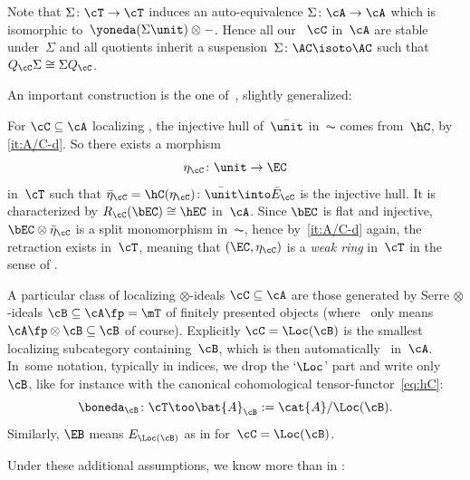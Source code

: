 \begin{Rem}
\label{Rem:Sigma}
Note that $\Sigma\colon \cT\to \cT$ induces an auto-equivalence $\Sigma\colon \cA\to \cA$ which is isomorphic to~$\yoneda(\Sigma\unit)\otimes-$. Hence all our \tensids~$\cC$ in~$\cA$ are stable under~$\Sigma$ and all quotients inherit a suspension~$\Sigma\colon \AC\isoto \AC$ such that $Q_\cC\Sigma\cong\Sigma Q_\cC$.
\end{Rem}

An important construction is the one of~\cite[\S3]{BalmerKrauseStevenson19}, slightly generalized:
\begin{Cons}
\label{Cons:E_C}
For $\cC\subseteq\cA$ localizing \tensid, the injective hull of~$\bar{\unit}$ in~$\AC$ comes from~$\hC$, by \,\eqref{it:A/C-d}. So there exists a morphism
\[
\eta_\cC\colon \unit\to \EC
\]
in~$\cT$ such that $\bar\eta_\cC=\hC(\eta_\cC)\colon \bar{\unit}\into \bar E_\cC$ is the injective hull. It is characterized by $R_\cC(\bEC)\cong\hEC$ in~$\cA$. Since $\bEC$ is flat and injective, $\bEC\otimes\bar\eta_{\cC}$ is a split monomorphism in~$\AC$, hence by \,\eqref{it:A/C-d} again, the retraction exists in~$\cT$, meaning that $(\EC,\eta_\cC)$ is a \emph{weak ring} in~$\cT$ in the sense of .
\end{Cons}

\begin{Rec}
\label{Rec:A/B}
A particular class of localizing $\otimes$-ideals $\cC\subseteq\cA$ are those generated by Serre $\otimes$-ideals $\cB\subseteq\cA\fp=\mT$ of finitely presented objects (where \tensid\ only means $\cA\fp\otimes\cB\subseteq\cB$ of course). Explicitly $\cC=\Loc(\cB)$ is the smallest localizing subcategory containing~$\cB$, which is then automatically \tensid\ in~$\cA$. In~some notation, typically in indices, we drop the `$\Loc$' part and write only~$\cB$, like for instance with the canonical cohomological tensor-functor~\eqref{eq:hC}:
\begin{equation}
\label{eq:hB}
\boneda_{\cB}\colon \cT\too \bat{A}_\cB:=\cat{A}/\Loc(\cB).
\end{equation}
Similarly, $\EB$ means $E_{\Loc(\cB)}$ as in  for~$\cC=\Loc(\cB)$.
\end{Rec}

Under these additional assumptions, we know more than in :

